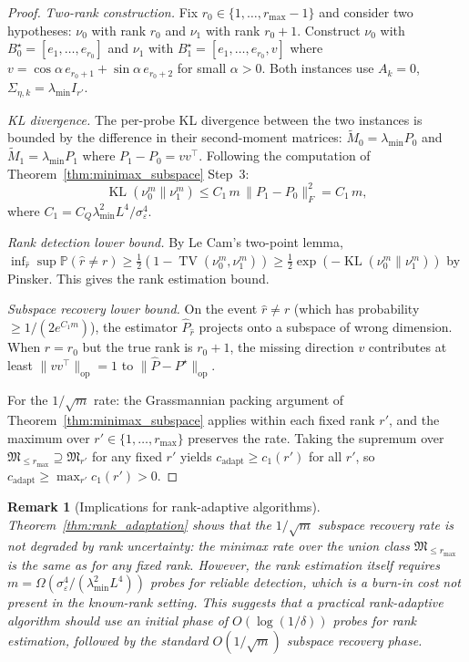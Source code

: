 \documentclass[12pt]{article}
\newcommand{\Prob}{\mathbb{P}}
\newcommand{\op}{\mathrm{op}}
\DeclareMathOperator{\TV}{TV}
\DeclareMathOperator{\KL}{KL}
\newtheorem{remark}{Remark}
\theoremstyle{plain}
\theoremstyle{definition}
\begin{document}
\begin{proof}
\emph{Two-rank construction.}
Fix $r_0 \in \{1, \ldots, r_{\max} - 1\}$ and consider two hypotheses: $\nu_0$ with rank $r_0$ and $\nu_1$ with rank $r_0 + 1$. Construct $\nu_0$ with $B_0^\star = [e_1, \ldots, e_{r_0}]$ and $\nu_1$ with $B_1^\star = [e_1, \ldots, e_{r_0}, v]$ where $v = \cos\alpha\, e_{r_0+1} + \sin\alpha\, e_{r_0+2}$ for small $\alpha > 0$. Both instances use $A_k = 0$, $\Sigma_{\eta,k} = \lambda_{\min} I_{r'}$.

\emph{KL divergence.}
The per-probe KL divergence between the two instances is bounded by the difference in their second-moment matrices: $\widetilde{M}_0 = \lambda_{\min} P_0$ and $\widetilde{M}_1 = \lambda_{\min} P_1$ where $P_1 - P_0 = vv^\top$. Following the computation of Theorem~\ref{thm:minimax_subspace} Step~3:
\[
\KL(\nu_0^m \| \nu_1^m) \le C_1\, m\, \|P_1 - P_0\|_F^2 = C_1\, m,
\]
where $C_1 = C_Q \lambda_{\min}^2 L^4 / \sigma_\varepsilon^4$.

\emph{Rank detection lower bound.}
By Le Cam's two-point lemma, $\inf_{\hat{r}} \sup \Prob(\hat{r} \neq r) \ge \frac{1}{2}(1 - \TV(\nu_0^m, \nu_1^m)) \ge \frac{1}{2}\exp(-\KL(\nu_0^m \| \nu_1^m))$ by Pinsker. This gives the rank estimation bound.

\emph{Subspace recovery lower bound.}
On the event $\hat{r} \neq r$ (which has probability $\ge 1/(2e^{C_1 m})$), the estimator $\widehat{P}_{\hat{r}}$ projects onto a subspace of wrong dimension. When $\hat{r} = r_0$ but the true rank is $r_0 + 1$, the missing direction $v$ contributes at least $\|vv^\top\|_{\op} = 1$ to $\|\widehat{P} - P^\star\|_{\op}$.

For the $1/\sqrt{m}$ rate: the Grassmannian packing argument of Theorem~\ref{thm:minimax_subspace} applies within each fixed rank $r'$, and the maximum over $r' \in \{1, \ldots, r_{\max}\}$ preserves the rate. Taking the supremum over $\mathfrak{M}_{\le r_{\max}} \supseteq \mathfrak{M}_{r'}$ for any fixed $r'$ yields $c_{\mathrm{adapt}} \ge c_1(r')$ for all $r'$, so $c_{\mathrm{adapt}} \ge \max_{r'} c_1(r') > 0$.
\end{proof}

\begin{remark}[Implications for rank-adaptive algorithms]
Theorem~\ref{thm:rank_adaptation} shows that the $1/\sqrt{m}$ subspace recovery rate is \emph{not} degraded by rank uncertainty: the minimax rate over the union class $\mathfrak{M}_{\le r_{\max}}$ is the same as for any fixed rank. However, the rank estimation itself requires $m = \Omega(\sigma_\varepsilon^4 / (\lambda_{\min}^2 L^4))$ probes for reliable detection, which is a burn-in cost not present in the known-rank setting. This suggests that a practical rank-adaptive algorithm should use an initial phase of $O(\log(1/\delta))$ probes for rank estimation, followed by the standard $O(1/\sqrt{m})$ subspace recovery phase.
\end{remark}
\end{document}
